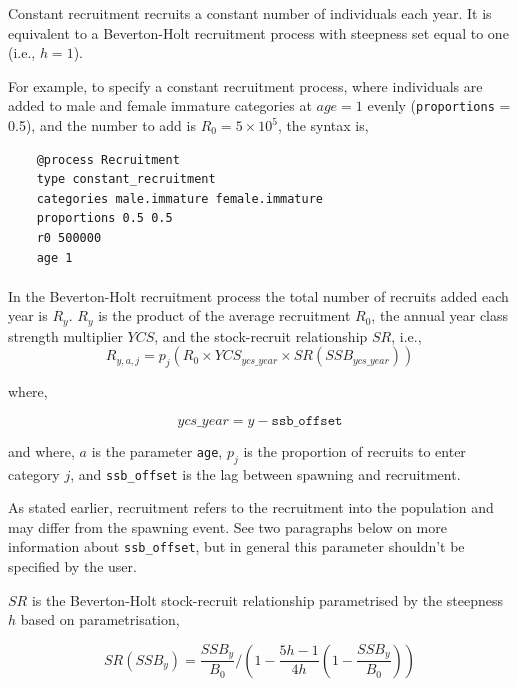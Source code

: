 Constant recruitment recruits a constant number of individuals each year. It is equivalent to a Beverton-Holt recruitment process with steepness set equal to one (i.e., $h=1$).

For example, to specify a constant recruitment process, where individuals are added to male and female immature categories at $age=1$ evenly (\texttt{proportions} = 0.5), and the number to add is $R_0=5 \times 10^5$, the syntax is,

{\small{\begin{verbatim}
	@process Recruitment
	type constant_recruitment
	categories male.immature female.immature
	proportions 0.5 0.5
	r0 500000
	age 1
\end{verbatim}}}

\paragraph{}\label{subsubsec:BH-recruitment}

In the Beverton-Holt recruitment process the total number of recruits added each year is $R_y$. $R_y$ is the product of the average recruitment $R_0$, the annual year class strength multiplier $YCS$, and the stock-recruit relationship $SR$, i.e.,
\begin{equation}\label{eq:BH}
  R_{y,a,j} = p_j(R_0 \times YCS_{ycs\_year} \times SR(SSB_{ycs\_year}))
\end{equation}

where,

\begin{equation}\label{eq:year_class}
ycs\_year = y - \texttt{ssb\_offset}
\end{equation}

and where, $a$ is the parameter \texttt{age}, $p_j$ is the proportion of recruits to enter category $j$, and \texttt{ssb\_offset} is the lag between spawning and recruitment. 

As stated earlier, recruitment refers to the recruitment into the population and may differ from the spawning event. See two paragraphs below on more information about \texttt{ssb\_offset}, but in general this parameter shouldn't be specified by the user.

$SR$ is the Beverton-Holt stock-recruit relationship parametrised by the steepness $h$ based on \cite{mace_doonan_88} parametrisation,

\begin{equation}\label{eq:BH_SR}
SR(SSB_y) = \frac{SSB_y}{B_0} / \left( 1-\frac{5h-1}{4h} \left( 1-\frac{SSB_y}{B_0} \right) \right)
\end{equation}

